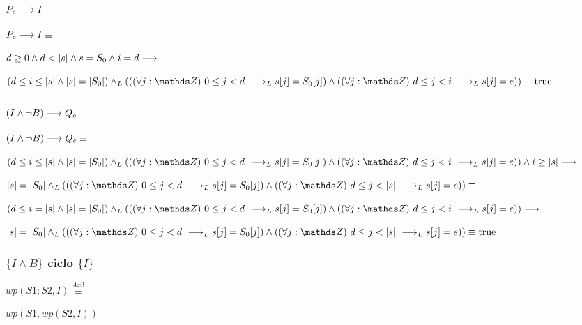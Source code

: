 \documentclass{article}
\begin{document}
\subsubsection*{$P_{c} \longrightarrow I$}

$P_{c} \longrightarrow I \equiv$

$ d \geq 0 \wedge d < |s| \wedge s = S_{0} \wedge i = d \longrightarrow$

$ (d \leq i \leq \longitud{s} \wedge \longitud{s} = \longitud{S_{0}}) \yLuego ((\paraTodo{j}{0}{d}\implicaLuego s[j] = S_{0}[j]) \wedge (\paraTodo{j}{d}{i}\implicaLuego s[j] = e )) \equiv \True$

\subsubsection*{$(I \wedge \neg B) \longrightarrow Q_{c}$}

$(I \wedge \neg B) \longrightarrow Q_{c} \equiv \\$

$(d \leq i \leq \longitud{s} \wedge \longitud{s} = \longitud{S_{0}}) \yLuego ((\paraTodo{j}{0}{d}\implicaLuego s[j] = S_{0}[j]) \wedge (\paraTodo{j}{d}{i}\implicaLuego s[j] = e )) \wedge i \geq \longitud{s} \implica$

$\longitud{s} = \longitud{S_{0}} \yLuego ((\paraTodo{j}{0}{d}\implicaLuego s[j] = S_{0}[j]) \wedge (\paraTodo{j}{d}{\longitud{s}}\implicaLuego s[j] = e )) \equiv \\$

$(d \leq i = \longitud{s} \wedge \longitud{s} = \longitud{S_{0}}) \yLuego ((\paraTodo{j}{0}{d}\implicaLuego s[j] = S_{0}[j]) \wedge (\paraTodo{j}{d}{i}\implicaLuego s[j] = e )) \implica$

$\longitud{s} = \longitud{S_{0}} \yLuego ((\paraTodo{j}{0}{d}\implicaLuego s[j] = S_{0}[j]) \wedge (\paraTodo{j}{d}{\longitud{s}}\implicaLuego s[j] = e )) \equiv \True$

\subsubsection*{$\{I \wedge B\}$ ciclo $\{ I \}$}

$wp(S1;S2, I) \stackrel{Ax3}{\equiv}$

$wp(S1, wp(S2, I))$
\end{document}
